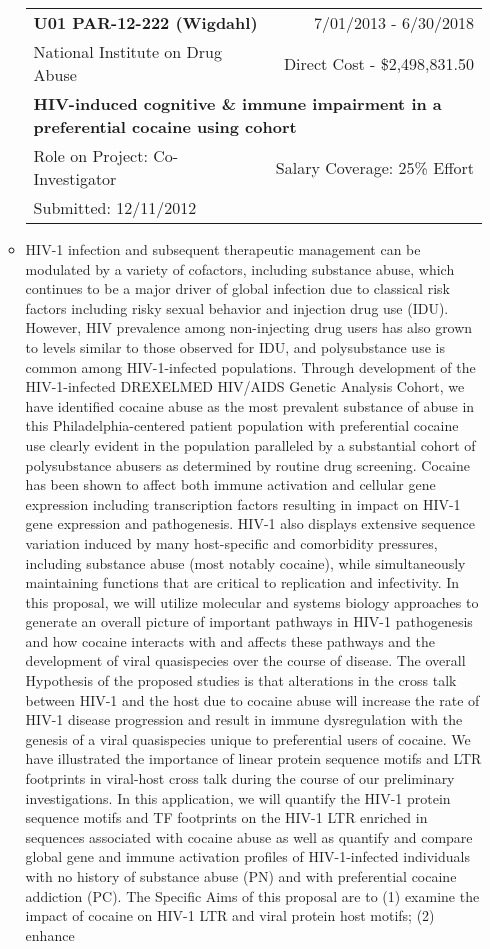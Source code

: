 \documentclass[a4paper,11pt]{article}
\makeatletter
\newenvironment{fullwidth}
    {\par
     \setlength{\@totalleftmargin}{0pt}%
     \setlength{\linewidth}{\hsize}%
     \list{}{\setlength{\leftmargin}{0pt}}
     \item\relax}
    {\endlist}
\makeatother
\begin{document}
\begin{enumerate}
\begin{itemize}
  \begin{longtable}{lr}
    \textbf{U01 PAR-12-222 (Wigdahl)} & 7/01/2013 - 6/30/2018 \\
    National Institute on Drug Abuse & Direct Cost - \$2,498,831.50 \\
    \multicolumn{2}{p{0.973\textwidth}}{\bfseries HIV-induced cognitive \& immune impairment in a preferential cocaine using cohort } \\
    Role on Project:  Co-Investigator & Salary Coverage: 25\% Effort\\
    Submitted: 12/11/2012\\
    \end{longtable}
   \begin{fullwidth}
   HIV-1 infection and subsequent therapeutic management can be modulated by a variety of cofactors, including substance abuse, which continues to be a major driver of global infection due to classical risk factors including risky sexual behavior and injection drug use (IDU).  However, HIV prevalence among non-injecting drug users has also grown to levels similar to those observed for IDU, and polysubstance use is common among HIV-1-infected populations.  Through development of the HIV-1-infected DREXELMED HIV/AIDS Genetic Analysis Cohort, we have identified cocaine abuse as the most prevalent substance of abuse in this Philadelphia-centered patient population with preferential cocaine use clearly evident in the population paralleled by a substantial cohort of polysubstance abusers as determined by routine drug screening.  Cocaine has been shown to affect both immune activation and cellular gene expression including transcription factors resulting in impact on HIV-1 gene expression and pathogenesis.  HIV-1 also displays extensive sequence variation induced by many host-specific and comorbidity pressures, including substance abuse (most notably cocaine), while simultaneously maintaining functions that are critical to replication and infectivity. In this proposal, we will utilize molecular and systems biology approaches to generate an overall picture of important pathways in HIV-1 pathogenesis and how cocaine interacts with and affects these pathways and the development of viral quasispecies over the course of disease.  The overall Hypothesis of the proposed studies is that alterations in the cross talk between HIV-1 and the host due to cocaine abuse will increase the rate of HIV-1 disease progression and result in immune dysregulation with the genesis of a viral quasispecies unique to preferential users of cocaine.  We have illustrated the importance of linear protein sequence motifs and LTR footprints in viral-host cross talk during the course of our preliminary investigations.  In this application, we will quantify the HIV-1 protein sequence motifs and TF footprints on the HIV-1 LTR enriched in sequences associated with cocaine abuse as well as quantify and compare global gene and immune activation profiles of HIV-1-infected individuals with no history of substance abuse (PN) and with preferential cocaine addiction (PC). The Specific Aims of this proposal are to (1) examine the impact of cocaine on HIV-1 LTR and viral protein host motifs; (2) enhance 
\end{fullwidth}
\end{itemize}
\end{enumerate}
\end{document}
